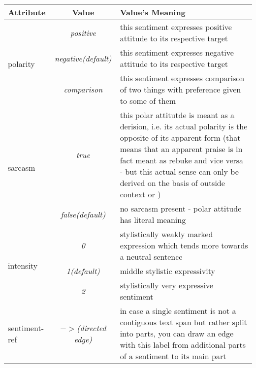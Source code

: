 \documentclass[11pt,a4paper]{article}
\begin{document}
\begin{tabular}{|l|c|p{}|}\hline
  Attribute & Value & Value's Meaning\\\hline

  \multirow{3}{*}{polarity} & \textit{positive} & this sentiment
  expresses positive attitude to its respective target\\\cline{2-3}

  & \textit{negative\newline(default)} & this sentiment
  expresses negative attitude to its respective target\\\cline{2-3}

  & \textit{comparison} & this sentiment expresses comparison of two
  things with preference given to some of them\\\hline

  \multirow{2}{*}{sarcasm} & \textit{true} & this polar attitutde is
  meant as a derision, i.e. its actual polarity is the opposite of its
  apparent form (that means that an apparent praise is in fact meant
  as rebuke and vice versa - but this actual sense can only be
  derived on the basis of outside context or )\\\cline{2-3}

  & \textit{false\newline(default)} & no sarcasm present - polar
  attitude has literal meaning\\\hline

  \multirow{3}{*}{intensity} & \textit{0} & stylistically weakly
  marked expression which tends more towards a neutral
  sentence\\\cline{2-3}

  & \textit{1\newline(default)} & middle stylistic
  expressivity\\\cline{2-3}

  & \textit{2} & stylistically very expressive sentiment\\\hline

  sentiment-ref & \textit{$->$\newline(directed edge)} & in case a
  single sentiment is not a contiguous text span but rather split into
  parts, you can draw an edge with this label from additional parts of
  a sentiment to its main part\\\hline
\end{tabular}

\end{document}
